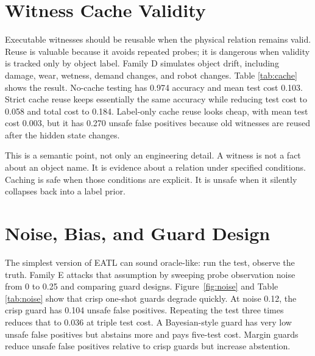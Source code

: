 \documentclass{article}
\begin{document}
\section{Witness Cache Validity}

Executable witnesses should be reusable when the physical relation remains
valid.  Reuse is valuable because it avoids repeated probes; it is dangerous
when validity is tracked only by object label.  Family D simulates object drift,
including damage, wear, wetness, demand changes, and robot changes.  Table
\ref{tab:cache} shows the result.  No-cache testing has 0.974 accuracy and mean
test cost 0.103.  Strict cache reuse keeps essentially the same accuracy while
reducing test cost to 0.058 and total cost to 0.184.  Label-only cache reuse
looks cheap, with mean test cost 0.003, but it has 0.270 unsafe false positives
because old witnesses are reused after the hidden state changes.

\begin{table}[t]
\centering
\small

\caption{Cache validity under object and demand drift.  Label-only reuse is
cheap but unsafe; strict validity reuse saves test cost without the same stale
witness failure.}
\label{tab:cache}
\end{table}

This is a semantic point, not only an engineering detail.  A witness is not a
fact about an object name.  It is evidence about a relation under specified
conditions.  Caching is safe when those conditions are explicit.  It is unsafe
when it silently collapses back into a label prior.

\section{Noise, Bias, and Guard Design}

The simplest version of EATL can sound oracle-like: run the test, observe the
truth.  Family E attacks that assumption by sweeping probe observation noise
from 0 to 0.25 and comparing guard designs.  Figure~\ref{fig:noise} and Table
\ref{tab:noise} show that crisp one-shot guards degrade quickly.  At noise
0.12, the crisp guard has 0.104 unsafe false positives.  Repeating the test
three times reduces that to 0.036 at triple test cost.  A Bayesian-style guard
has very low unsafe false positives but abstains more and pays five-test cost.
Margin guards reduce unsafe false positives relative to crisp guards but
increase abstention.
\end{document}
